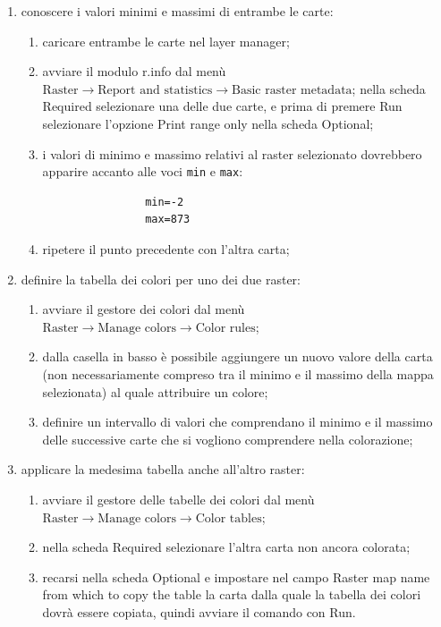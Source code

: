 	\begin{enumerate}
		\item conoscere i valori minimi e massimi di entrambe le carte:

		\begin{enumerate}
			\item caricare entrambe le carte nel layer manager;
			\item avviare il modulo \textsf{r.info} dal menù \textsf{$\text{Raster}\rightarrow\text{Report~and~statistics}\rightarrow\text{Basic~raster~metadata}$}; nella scheda \textsf{Required} selezionare una delle due carte, e prima di premere \textsf{Run} selezionare l'opzione \textsf{Print range only} nella scheda \textsf{Optional};
			\item i valori di minimo e massimo relativi al raster selezionato dovrebbero apparire accanto alle voci \texttt{min} e \texttt{max}:

			\begin{verbatim}
				min=-2
				max=873
			\end{verbatim}
		
			\item ripetere il punto precedente con l'altra carta;
		\end{enumerate}
		
		\item definire la tabella dei colori per uno dei due raster:

		\begin{enumerate}
			\item avviare il gestore dei colori dal menù \textsf{$\text{Raster}\rightarrow\text{Manage~colors}\rightarrow\text{Color~rules}$};
			\item dalla casella in basso è possibile aggiungere un nuovo valore della carta (non necessariamente compreso tra il minimo e il massimo della mappa selezionata) al quale attribuire un colore;
			\item definire un intervallo di valori che comprendano il minimo e il massimo delle successive carte che si vogliono comprendere nella colorazione;
		\end{enumerate}

		\item applicare la medesima tabella anche all'altro raster:

		\begin{enumerate}
			\item avviare il gestore delle tabelle dei colori dal menù \textsf{$\text{Raster}\rightarrow\text{Manage~colors}\rightarrow\text{Color~tables}$};
			\item nella scheda \textsf{Required} selezionare l'altra carta non ancora colorata;
			\item recarsi nella scheda \textsf{Optional} e impostare nel campo \textsf{Raster map name from which to copy the table} la carta dalla quale la tabella dei colori dovrà essere copiata, quindi avviare il comando con \textsf{Run}.
		\end{enumerate}
	\end{enumerate}
